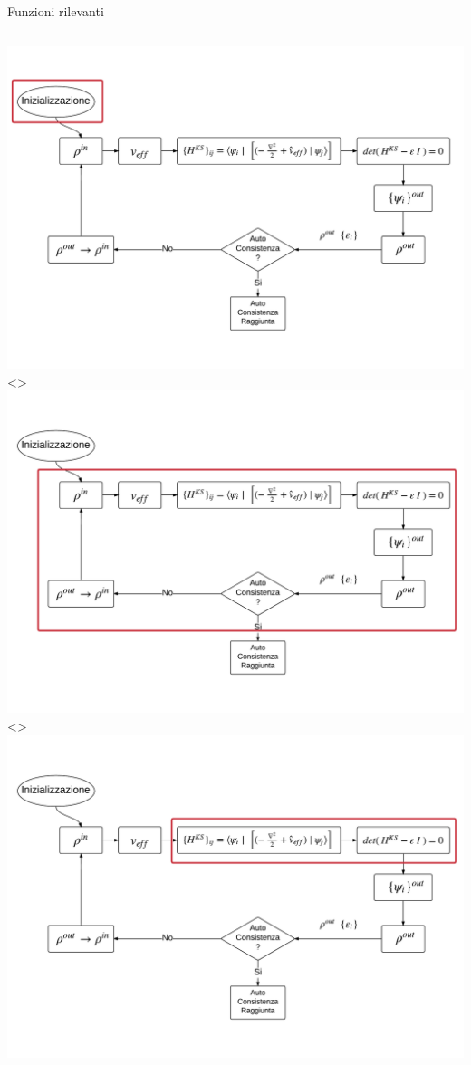 \documentclass[8pt]{beamer}
\begin{document}
\begin{frame}{Funzioni rilevanti}
{\begin{minipage}[t][0.5\textheight][t]{\textwidth}
\begin{columns}
\begin{flushleft}
{					\includegraphics[height=\scfPicHeight\textheight, width=\scfPicWidth\textwidth]{beam_SCF_init_run.pdf}	
				}
				\only<\electronsPos>{
					\includegraphics[height=\scfPicHeight\textheight, width=\scfPicWidth\textwidth]{beam_SCF_electrons.pdf}	
				}				
				\only<\cegtergPos>{
					\includegraphics[height=\scfPicHeight\textheight, width=\scfPicWidth\textwidth]{beam_SCF_cegterg.pdf}	
}
\end{flushleft}
\end{columns}
\end{minipage}}
\end{frame}
\end{document}
